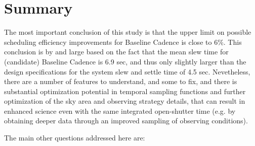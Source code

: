 \navigationbar


\section{Summary}
\def\secname{cadexp:summary}\label{sec:\secname}

The most important conclusion of this study is that the upper limit on
possible scheduling efficiency improvements for Baseline Cadence is
close to 6\%. This conclusion is by and large based on the fact that
the mean slew time for (candidate) Baseline Cadence is 6.9 sec, and
thus only slightly larger than the design specifications for the
system slew and settle time of 4.5 sec.  Nevetheless, there are a
number of features to understand, and some to fix, and there is
substantial optimization potential in temporal sampling functions and
further optimization of the sky area and observing strategy details,
that can result in enhanced science even with the same integrated
open-shutter time (e.g. by obtaining deeper data through an improved
sampling of observing conditions).

\vskip 0.2in
The main other questions addressed here are:

